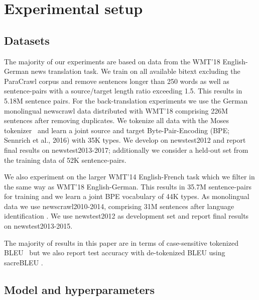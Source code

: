 \documentclass[11pt,a4paper]{article}
\begin{document}
\section{Experimental setup}
\label{sec:setup}

\subsection{Datasets}

The majority of our experiments are based on data from the WMT'18 English-German news translation task. 
We train on all available bitext excluding the ParaCrawl corpus and remove sentences longer than 250 words as well as sentence-pairs with a source/target length ratio exceeding 1.5.
This results in 5.18M sentence pairs. 
For the back-translation experiments we use the German monolingual newscrawl data distributed with WMT'18 comprising 226M sentences after removing duplicates.
We tokenize all data with the Moses tokenizer~\cite{koehn:moses:2007} and learn a joint source and target Byte-Pair-Encoding (BPE; Sennrich et al., 2016)\nocite{sennrich:bpe:2016} with 35K types.
We develop on newstest2012 and report final results on newstest2013-2017; additionally we consider a held-out set from the training data of 52K sentence-pairs.

We also experiment on the larger WMT'14 English-French task which we filter in the same way as WMT'18 English-German.
This results in 35.7M sentence-pairs for training and we learn a joint BPE vocabulary of 44K types.
As monolingual data we use newscrawl2010-2014, comprising 31M sentences after language identification \citep{lui2012langid}.
We use newstest2012 as development set and report final results on newstest2013-2015.

The majority of results in this paper are in terms of case-sensitive tokenized BLEU~\cite{papineni:bleu:2002} but we also report test accuracy with de-tokenized BLEU using sacreBLEU \citep{post:sacre:2018}.


\subsection{Model and hyperparameters}
\end{document}
